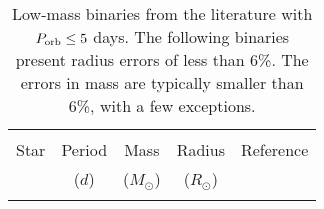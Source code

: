 \documentclass[fleqn,usenatbib]{mnras}
\begin{document}
\begin{table*}
\begin{center}
\caption{Low-mass binaries from the literature with $P_{\rm orb} \leq 5$ days. The following binaries present radius errors of less than 6\%. The errors in mass are typically smaller than 6\%, with a few exceptions.
}
\label{tab_lit}
\begin{tabular}{lcccc}
\hline \hline \\ [-3ex]
Star  & Period & Mass & Radius & Reference \\
	  & ($d$) & ($M_{\odot}$) & ($R_{\odot}$) &  \\

\hline\\  [-2ex]


\end{tabular}
\end{center}
\end{table*}
\end{document}

